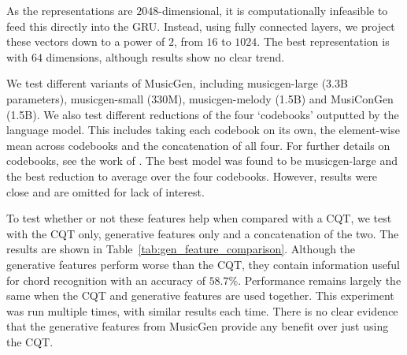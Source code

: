 As the representations are $2048$-dimensional, it is computationally infeasible to feed this directly into the GRU. Instead, using fully connected layers, we project these vectors down to a power of $2$, from $16$ to $1024$. The best representation is with $64$ dimensions, although results show no clear trend.

We test different variants of MusicGen, including musicgen-large (3.3B parameters), musicgen-small (330M), musicgen-melody (1.5B) and MusiConGen (1.5B). We also test different reductions of the four `codebooks' outputted by the language model. This includes taking each codebook on its own, the element-wise mean across codebooks and the concatenation of all four. For further details on codebooks, see the work of \cite{MusicGen}. The best model was found to be musicgen-large and the best reduction to average over the four codebooks. However, results were close and are omitted for lack of interest.



To test whether or not these features help when compared with a CQT, we test with the CQT only, generative features only and a concatenation of the two. The results are shown in Table~\ref{tab:gen_feature_comparison}. Although the generative features perform worse than the CQT, they contain information useful for chord recognition with an accuracy of $58.7\%$. Performance remains largely the same when the CQT and generative features are used together. This experiment was run multiple times, with similar results each time. There is no clear evidence that the generative features from MusicGen provide any benefit over just using the CQT. 


